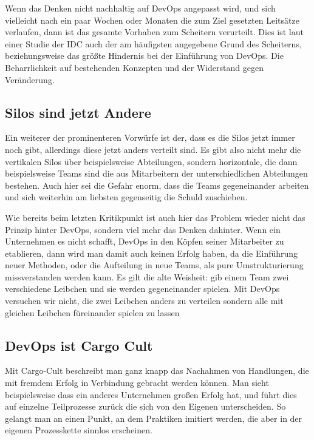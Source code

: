 Wenn das Denken nicht nachhaltig auf \ac{DevOps} angepasst wird, und sich vielleicht nach ein paar Wochen oder Monaten die zum Ziel gesetzten Leitsätze verlaufen, dann ist das gesamte Vorhaben zum Scheitern verurteilt. Dies ist laut einer Studie der \ac{IDC} \cite{idc:2020} auch der am häufigsten angegebene Grund des Scheiterns, beziehungsweise das größte Hindernis bei der Einführung von \ac{DevOps}. Die Beharrlichkeit auf bestehenden Konzepten und der Widerstand gegen Veränderung.

\subsection{Silos sind jetzt Andere}

Ein weiterer der prominenteren Vorwürfe ist der, dass es die Silos jetzt immer noch gibt, allerdings diese jetzt anders verteilt sind. Es gibt also nicht mehr die vertikalen Silos über beispielsweise Abteilungen, sondern horizontale, die dann beispielsweise Teams sind die aus Mitarbeitern der unterschiedlichen Abteilungen bestehen. Auch hier sei die Gefahr enorm, dass die Teams gegeneinander arbeiten und sich weiterhin am liebsten gegenseitig die Schuld zuschieben.

Wie bereits beim letzten Kritikpunkt ist auch hier das Problem wieder nicht das Prinzip hinter \ac{DevOps}, sondern viel mehr das Denken dahinter. Wenn ein Unternehmen es nicht schafft, \ac{DevOps} in den Köpfen seiner Mitarbeiter zu etablieren, dann wird man damit auch keinen Erfolg haben, da die Einführung neuer Methoden, oder die Aufteilung in neue Teams, als pure Umstrukturierung missverstanden werden kann. \glqq Es gilt die alte Weisheit: gib einem Team zwei verschiedene Leibchen und sie werden gegeneinander spielen. Mit DevOps versuchen wir nicht, die zwei Leibchen anders zu verteilen sondern alle mit gleichen Leibchen füreinander spielen zu lassen\grqq \cite{halstenberg:2020}

\subsection{DevOps ist Cargo Cult}

Mit Cargo-Cult beschreibt man ganz knapp das Nachahmen von Handlungen, die mit fremdem Erfolg in Verbindung gebracht werden können. Man sieht beispielsweise dass ein anderes Unternehmen großen Erfolg hat, und führt dies auf einzelne Teilprozesse zurück die sich von den Eigenen unterscheiden. So gelangt man an einen Punkt, an dem Praktiken imitiert werden, die aber in der eigenen Prozesskette sinnlos erscheinen.

